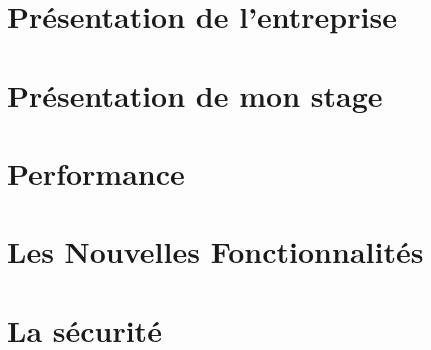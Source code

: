 \documentclass[asi]{picINSA}
\begin{document}
 \couverture{}
 \informationsGenerales{}
 \tableofcontents
 
\listoffigures
{}

\chapter{Présentation de l'entreprise}
	

\chapter{Présentation de mon stage}
	

\chapter{Performance}
	

\chapter{Les Nouvelles Fonctionnalités}
	

\chapter{La sécurité}
	

%  	

 \pageQuatriemeCouverture{}	
\end{document}
